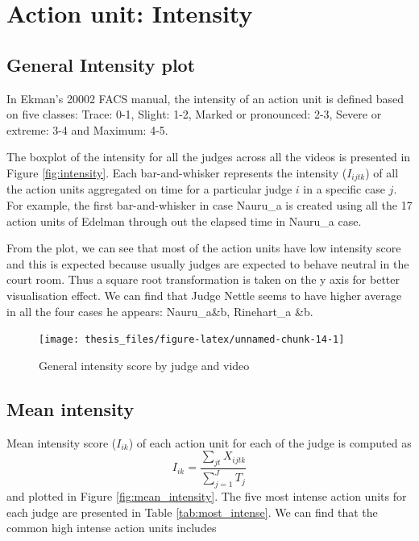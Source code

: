 \documentclass{monashthesis}
\begin{document}
\hypertarget{action-unit-intensity}{%
\section{Action unit: Intensity}\label{action-unit-intensity}}

\hypertarget{general-intensity-plot}{%
\subsection{General Intensity plot}\label{general-intensity-plot}}

In Ekman's 20002 FACS manual, the intensity of an action unit is defined based on five classes: Trace: 0-1, Slight: 1-2, Marked or pronounced: 2-3, Severe or extreme: 3-4 and Maximum: 4-5.

The boxplot of the intensity for all the judges across all the videos is presented in Figure \ref{fig:intensity}. Each bar-and-whisker represents the intensity (\(I_{ijtk}\)) of all the action units aggregated on time for a particular judge \(i\) in a specific case \(j\). For example, the first bar-and-whisker in case Nauru\_a is created using all the 17 action units of Edelman through out the elapsed time in Nauru\_a case.

From the plot, we can see that most of the action units have low intensity score and this is expected because usually judges are expected to behave neutral in the court room. Thus a square root transformation is taken on the y axis for better visualisation effect. We can find that Judge Nettle seems to have higher average in all the four cases he appears: Nauru\_a\&b, Rinehart\_a \&b.

\begin{figure}
\texttt{[image: thesis\_files/figure-latex/unnamed-chunk-14-1]} \caption{General intensity score by judge and video\label{fig:intensity}}\label{fig:unnamed-chunk-14}
\end{figure}

\hypertarget{mean-intensity}{%
\subsection{Mean intensity}\label{mean-intensity}}

Mean intensity score (\(I_{ik}\)) of each action unit for each of the judge is computed as \[I_{ik} = \frac{\sum_{jt}X_{ijtk}}{\sum_{j = 1}^JT_j}\] and plotted in Figure \ref{fig:mean_intensity}. The five most intense action units for each judge are presented in Table \ref{tab:most_intense}. We can find that the common high intense action units includes
\end{document}
